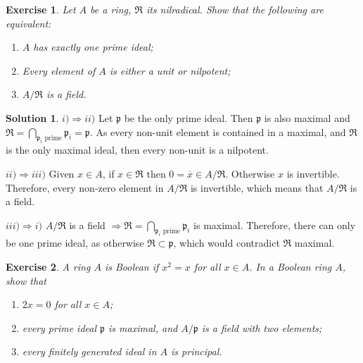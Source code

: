 \documentclass[12pt]{article}
\newcommand{\imp}{\ensuremath{\Rightarrow}}
\newcommand*\closure[1]{\overline{#1}}
\newtheorem{ex}{Exercise}[section]
\theoremstyle{definition}
\newtheorem*{sol}{Solution}
\begin{document}
\begin{ex}
	Let $A$ be a ring, $\mathfrak{R}$ its nilradical. Show that the following are equivalent:
	\begin{enumerate}[label=(\roman*)]
		\item $A$ has exactly one prime ideal;
		\item Every element of $A$ is either a unit or nilpotent;
		\item $A/\mathfrak{R}$ is a field.
	\end{enumerate}
\end{ex}

\begin{sol}
	$\boxed{i) \imp ii)}$ Let $\mathfrak{p}$ be the only prime ideal. Then $\mathfrak{p}$ is also maximal and $\mathfrak{R} = \bigcap_{\mathfrak{p}_i \text{ prime}} \mathfrak{p}_i = \mathfrak{p}$. As every non-unit element is contained in a maximal, and $\mathfrak{R}$ is the only maximal ideal, then every non-unit is a nilpotent.

	\vspace{3mm}

	\noindent $\boxed{ii) \imp iii)}$ Given $x \in A$, if $x \in \mathfrak{R}$ then $0 = \closure{x} \in A/\mathfrak{R}$. Otherwise $x$ is invertible. Therefore, every non-zero element in $A/\mathfrak{R}$ is invertible, which means that $A/\mathfrak{R}$ is a field.

	\vspace{3mm}

	\noindent $\boxed{iii) \imp i)}$ $A/\mathfrak{R}$ is a field $\imp \mathfrak{R} = \bigcap_{\mathfrak{p}_i \text{ prime}} \mathfrak{p}_i$ is maximal. Therefore, there can only be one prime ideal, as otherwise $\mathfrak{R} \subset \mathfrak{p}$, which would contradict $\mathfrak{R}$ maximal.
\end{sol}

\begin{ex}
	A ring $A$ is Boolean if $x^2 = x$ for all $x \in A$. In a Boolean ring $A$, show that
	\begin{enumerate}[label=(\roman*)]
		\item $2x = 0$ for all $x \in A$;
		\item every prime ideal $\mathfrak{p}$ is maximal, and $A/\mathfrak{p}$ is a field with two elements;
		\item every finitely generated ideal in $A$ is principal.
	\end{enumerate}
\end{ex}
\end{document}
